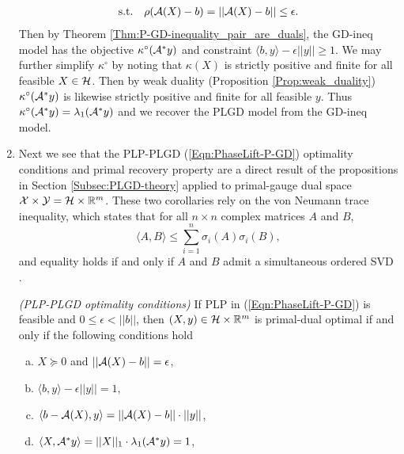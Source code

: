 \begin{enumerate}
\begin{equation*}
\begin{array}{ll}
		\textnormal{s.t.}
		& 	\rho({\mathcal A}(X)-b) = ||{\mathcal A}(X) - b|| \leq \epsilon.
\end{array}
\end{equation*}
Then by Theorem \ref{Thm:P-GD-inequality_pair_are_duals}, the GD-ineq model has the objective $\kappa^\circ({\mathcal A}^*y)$ and constraint $\langle b, y \rangle - \epsilon ||y|| \geq 1$.  We may further simplify $\kappa^\circ$ by noting that $\kappa(X)$ is strictly positive and finite for all feasible $X \in {\mathcal H}$.  Then by weak duality (Proposition \ref{Prop:weak_duality}) $\kappa^\circ({\mathcal A}^*y)$ is likewise strictly positive and finite for all feasible $y$.  Thus $\kappa^\circ({\mathcal A}^*y) = \lambda_1({\mathcal A}^*y)$ and we recover the PLGD model from the GD-ineq model.




\item

Next we see that the PLP-PLGD (\ref{Eqn:PhaseLift-P-GD}) optimality conditions and primal recovery property are a direct result of the propositions in Section \ref{Subsec:PLGD-theory} applied to primal-gauge dual space ${\mathcal X} \times {\mathcal Y} = {\mathcal H} \times {\mathbb R}^m$.  These two corollaries rely on the von Neumann trace inequality, which states that for all $n \times n$ complex matrices $A$ and $B$,
\begin{equation}			\label{Eqn:von_Neumann_trace_inequality}
\langle A, B \rangle \leq \sum_{i=1}^n \sigma_i(A) \sigma_i(B),
\end{equation}
and equality holds if and only if $A$ and $B$ admit a simultaneous ordered SVD \cite{grigorieff1991note}.

\begin{cor} 		\label{Cor:PLGD-optimality}
\emph{(PLP-PLGD optimality conditions)}
If PLP in (\ref{Eqn:PhaseLift-P-GD}) is feasible and $0 \leq \epsilon < ||b||$, then $(X, y) \in {\mathcal H} \times {\mathbb R}^m$ is primal-dual optimal if and only if the following conditions hold
\begin{enumerate}[(a)]
\item
$X \succeq 0$ and $||{\mathcal A}(X) -b||=\epsilon$,

\item
$\langle b, y \rangle - \epsilon ||y|| = 1$,

\item
$\langle b - {\mathcal A}(X), y \rangle = ||{\mathcal A}(X)-b|| \cdot ||y||$,

\item
$\langle X, {\mathcal A}^*y \rangle = ||X||_1 \cdot \lambda_1({\mathcal A}^*y) = 1$,


\end{enumerate}
\end{cor}
\end{enumerate}
